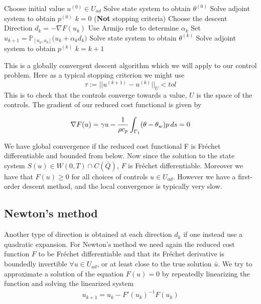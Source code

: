 \begin{codebox}
\li Choose initial value $u^{(0)}\in U_{ad}$
\li Solve state system to obtain $\theta^{(0)}$
\li Solve adjoint system to obtain $p^{(0)}$
\li $k=0$
\li \While (\textbf{Not} stopping criteria) \Then
\li Choose the descent Direction $d_k = -\nabla F(u_k)$
\li Use Armijo rule to determine $\alpha_k$
\li Set $u_{k+1} = \mathbb{P}_{[u_a,u_b]}\bigg (u_k + \alpha_k d_k \bigg )$
\li Solve state system to obtain $\theta^{(k)}$
\li Solve adjoint system to obtain $p^{(k)}$
\li $k = k +1$
\end{codebox}
This is a globally convergent descent algorithm which we will apply to our control problem. Here as a typical stopping criterion we might use 
\begin{equation}
    \label{eq:stopping}
    \tau := ||u^{(k+1)} - u^{(k)}||_U < tol
\end{equation}
This is to check that the controls converge towards a value, $U$ is the space of the controls. The gradient of our reduced cost functional is given by

\begin{equation*}
    \nabla F(u) =  \gamma u - \frac{1}{\rho c_p} \int_{\Gamma_1} (\theta - \theta_w)p \mathop{ds} = 0
\end{equation*}

We have global convergence if the reduced cost functional F is Fréchet differentiable and bounded from below. Now since the solution to the state system $S(u) \in W(0,T) \cap C(\bar{Q})$, $F$ is Fréchet differentiable. Moreover we have that $F(u) \geq 0$ for all choices of controls $u \in U_{ad}$. However we have a first-order descent method, and the local convergence is typically very slow. 

\subsection{Newton's method}
Another type of direction is obtained at each direction $d_k$ if one instead use a quadratic expansion. For Newton's method we need again the reduced cost function $F$ to be Fréchet differentiable and that its Fréchet derivative is boundedly invertible $\forall u \in U_{ad}$, or at least close to the true solution $\bar{u}$. We try to approximate a solution of the equation $F(u) = 0$ by repeatedly linearizing the function and solving the linearized system
\begin{align}
    \label{eq:Newton}
    u_{k+1} = u_k - F'(u_k)^{-1}F(u_k)
\end{align}


